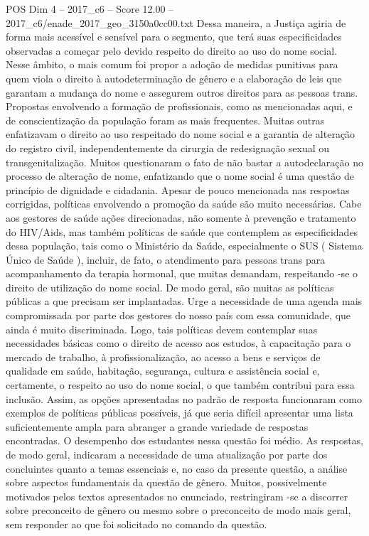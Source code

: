\begin{textsample}{POS Dim 4 – 2017\_c6 – Score 12.00 – 2017\_c6/enade\_2017\_geo\_3150a0cc00.txt}
Dessa maneira, a Justiça agiria de forma mais acessível e sensível para o segmento, que terá suas especificidades observadas a começar pelo devido respeito do direito ao uso do nome social.
Nesse âmbito, o mais comum foi propor a adoção de medidas punitivas para quem viola o direito à autodeterminação de gênero e a elaboração de leis que garantam a mudança do nome e assegurem outros direitos para as pessoas trans.
Propostas envolvendo a formação de profissionais, como as mencionadas aqui, e de conscientização da população foram as mais frequentes.
Muitas outras enfatizavam o direito ao uso respeitado do nome social e a garantia de alteração do registro civil, independentemente da cirurgia de redesignação sexual ou transgenitalização.
Muitos questionaram o fato de não bastar a autodeclaração no processo de alteração de nome, enfatizando que o nome social é uma questão de princípio de dignidade e cidadania.
Apesar de pouco mencionada nas respostas corrigidas, políticas envolvendo a promoção da saúde são muito necessárias.
Cabe aos gestores de saúde ações direcionadas, não somente à prevenção e tratamento do HIV/Aids, mas também políticas de saúde que contemplem as especificidades dessa população, tais como o Ministério da Saúde, especialmente o SUS ( Sistema Único de Saúde ), incluir, de fato, o atendimento para pessoas trans para acompanhamento da terapia hormonal, que muitas demandam, respeitando -se o direito de utilização do nome social.
De modo geral, são muitas as políticas públicas a que precisam ser implantadas.
Urge a necessidade de uma agenda mais compromissada por parte dos gestores do nosso país com essa comunidade, que ainda é muito discriminada.
Logo, tais políticas devem contemplar suas necessidades básicas como o direito de acesso aos estudos, à capacitação para o mercado de trabalho, à profissionalização, ao acesso a bens e serviços de qualidade em saúde, habitação, segurança, cultura e assistência social e, certamente, o respeito ao uso do nome social, o que também contribui para essa inclusão.
Assim, as opções apresentadas no padrão de resposta funcionaram como exemplos de políticas públicas possíveis, já que seria difícil apresentar uma lista suficientemente ampla para abranger a grande variedade de respostas encontradas.
O desempenho dos estudantes nessa questão foi médio.
As respostas, de modo geral, indicaram a necessidade de uma atualização por parte dos concluintes quanto a temas essenciais e, no caso da presente questão, a análise sobre aspectos fundamentais da questão de gênero.
Muitos, possivelmente motivados pelos textos apresentados no enunciado, restringiram -se a discorrer sobre preconceito de gênero ou mesmo sobre o preconceito de modo mais geral, sem responder ao que foi solicitado no comando da questão.

\end{textsample}
